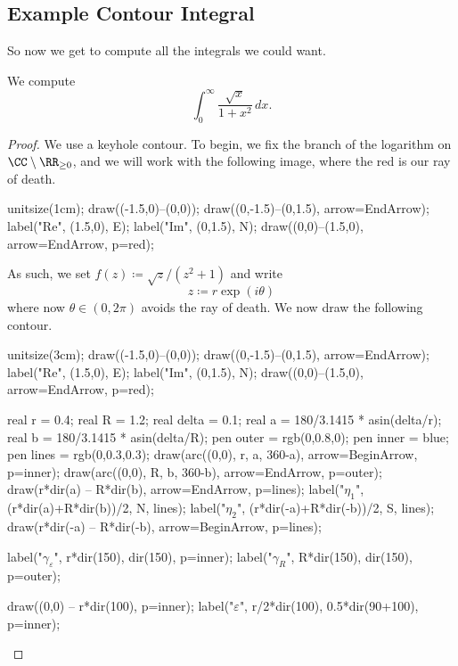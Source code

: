 \documentclass[../notes.tex]{subfiles}
\begin{document}
\subsection{Example Contour Integral}
So now we get to compute all the integrals we could want.
\begin{exe}
	We compute
	\[\int_0^\infty\frac{\sqrt x}{1+x^2}\,dx.\]
\end{exe}
\begin{proof}
	We use a keyhole contour. To begin, we fix the branch of the logarithm on $\CC\setminus\RR_{\ge0}$, and we will work with the following image, where the red is our ray of death.
	\begin{center}
		\begin{asy}
			unitsize(1cm);
			draw((-1.5,0)--(0,0));
			draw((0,-1.5)--(0,1.5), arrow=EndArrow);
			label("$\textrm{Re}$", (1.5,0), E);
			label("$\textrm{Im}$", (0,1.5), N);
			draw((0,0)--(1.5,0), arrow=EndArrow, p=red);
		\end{asy}
	\end{center}
	As such, we set $f(z)\coloneqq \sqrt z/\left(z^2+1\right)$ and write
	\[z\coloneqq r\exp(i\theta)\]
	where now $\theta\in(0,2\pi)$ avoids the ray of death. We now draw the following contour.
	\begin{center}
		\begin{asy}
			unitsize(3cm);
			draw((-1.5,0)--(0,0));
			draw((0,-1.5)--(0,1.5), arrow=EndArrow);
			label("$\textrm{Re}$", (1.5,0), E);
			label("$\textrm{Im}$", (0,1.5), N);
			draw((0,0)--(1.5,0), arrow=EndArrow, p=red);

			real r = 0.4;
			real R = 1.2;
			real delta = 0.1;
			real a = 180/3.1415 * asin(delta/r);
			real b = 180/3.1415 * asin(delta/R);
			pen outer = rgb(0,0.8,0);
			pen inner = blue;
			pen lines = rgb(0,0.3,0.3);
			draw(arc((0,0), r, a, 360-a), arrow=BeginArrow, p=inner);
			draw(arc((0,0), R, b, 360-b), arrow=EndArrow, p=outer);
			draw(r*dir(a) -- R*dir(b), arrow=EndArrow, p=lines);
			label("$\eta_1$", (r*dir(a)+R*dir(b))/2, N, lines);
			label("$\eta_2$", (r*dir(-a)+R*dir(-b))/2, S, lines);
			draw(r*dir(-a) -- R*dir(-b), arrow=BeginArrow, p=lines);

			label("$\gamma_\varepsilon$", r*dir(150), dir(150), p=inner);
			label("$\gamma_R$", R*dir(150), dir(150), p=outer);

			draw((0,0) -- r*dir(100), p=inner);
			label("$\varepsilon$", r/2*dir(100), 0.5*dir(90+100), p=inner);


\end{asy}
\end{center}
\end{proof}
\end{document}
